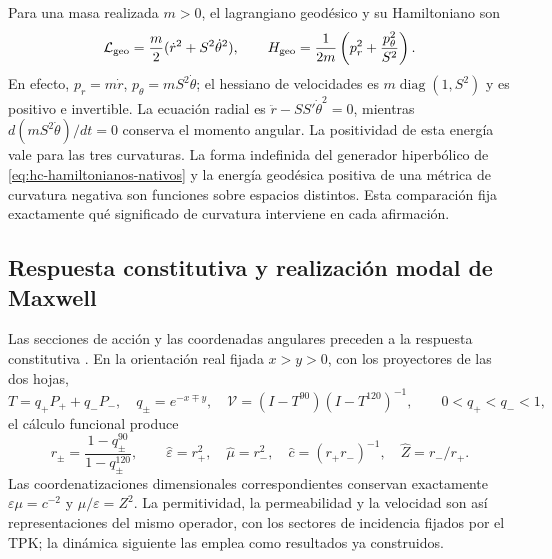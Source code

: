 Para una masa realizada \(m>0\), el lagrangiano geodésico y su
Hamiltoniano son
\begin{equation}
 \mathcal L_{\rm geo}=\frac m2(\dot r^2+S^2\dot\theta^2),\qquad
 H_{\rm geo}=\frac1{2m}\left(p_r^2+\frac{p_\theta^2}{S^2}\right).
 \label{eq:hc-geodesique}
\end{equation}
En efecto, \(p_r=m\dot r\), \(p_\theta=mS^2\dot\theta\);
el hessiano de velocidades es \(m\operatorname{diag}(1,S^2)\)
y es positivo e invertible. La ecuación radial es
\(\ddot r-SS'\dot\theta^2=0\), mientras
\(d(mS^2\dot\theta)/dt=0\) conserva el momento angular.
La positividad de esta energía vale para las tres curvaturas. La forma
indefinida del generador hiperbólico de \eqref{eq:hc-hamiltonianos-nativos}
y la energía geodésica positiva de una métrica de curvatura negativa
son funciones sobre espacios distintos. Esta comparación fija exactamente
qué significado de curvatura interviene en cada afirmación.

\subsection{Respuesta constitutiva y realización modal de Maxwell}

Las secciones de acción y las coordenadas angulares preceden a la
respuesta constitutiva \cite{hmtIntegral}. En la orientación real fijada \(x>y>0\),
con los proyectores de las dos hojas,
\[
 T=q_+P_++q_-P_-,\quad q_\pm=e^{-x\mp y},\quad
 \mathcal V=(I-T^{90})(I-T^{120})^{-1},
 \qquad 0<q_+<q_-<1,
\]
el cálculo funcional produce
\[
 r_\pm=\frac{1-q_\pm^{90}}{1-q_\pm^{120}},\qquad
 \widehat\varepsilon=r_+^2,\quad \widehat\mu=r_-^2,
 \quad \widehat c=(r_+r_-)^{-1},\quad \widehat Z=r_-/r_+.
\]
Las coordenatizaciones dimensionales correspondientes conservan exactamente
\(\varepsilon\mu=c^{-2}\) y \(\mu/\varepsilon=Z^2\).
La permitividad, la permeabilidad y la velocidad son así representaciones
del mismo operador, con los sectores de incidencia fijados por el TPK;
la dinámica siguiente las emplea como resultados ya construidos.


